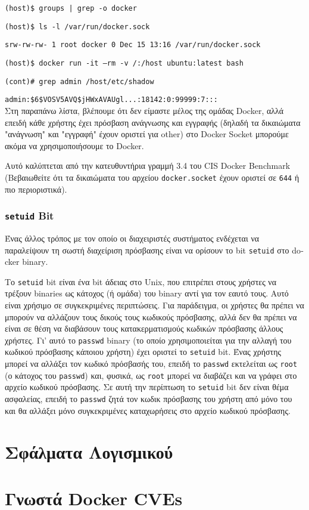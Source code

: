 \texttt{\textlatin{(host)\$ groups | grep -o docker}}

\texttt{\textlatin{(host)\$ ls -l /var/run/docker.sock}}

\texttt{\textlatin{srw-rw-rw- 1 root docker 0 Dec 15 13:16 /var/run/docker.sock}}

\texttt{\textlatin{(host)\$ docker run -it --rm -v /:/host ubuntu:latest bash}}

\texttt{\textlatin{(cont)\# grep admin /host/etc/shadow}}

\texttt{\textlatin{admin:\$6\$VOSV5AVQ\$jHWxAVAUgl...:18142:0:99999:7:::}} \\

Στη παραπάνω λίστα, βλέπουμε ότι δεν είμαστε μέλος της ομάδας
\textlatin{Docker}, αλλά επειδή κάθε χρήστης έχει πρόσβαση ανάγνωσης και
εγγραφής (δηλαδή τα δικαιώματα "ανάγνωση" και "εγγραφή" έχουν οριστεί για
\textlatin{other}) στο \textlatin{Docker Socket} μπορούμε ακόμα να
χρησιμοποιήσουμε το \textlatin{Docker}.

Αυτό καλύπτεται από την κατευθυντήρια γραμμή 3.4 του
\textlatin{CIS Docker Benchmark} (Βεβαιωθείτε ότι τα δικαιώματα του αρχείου
\texttt{\textlatin{docker.socket}} έχουν οριστεί σε \texttt{644} ή πιο
περιοριστικά).

\subsubsection{\texttt{\textlatin{setuid}} \textlatin{Bit}}

Ένας άλλος τρόπος με τον οποίο οι διαχειριστές συστήματος ενδέχεται να
παραλείψουν τη σωστή διαχείριση πρόσβασης είναι να ορίσουν το \textlatin{bit}
\texttt{\textlatin{setuid}} στο \textlatin{docker binary}.

Το \texttt{\textlatin{setuid}} \textlatin{bit} είναι ένα \textlatin{bit} άδειας
στο \textlatin{Unix}, που επιτρέπει στους χρήστες να τρέξουν
\textlatin{binaries} ως κάτοχος (ή ομάδα) του \textlatin{binary} αντί για τον
εαυτό τους. Αυτό είναι χρήσιμο σε συγκεκριμένες περιπτώσεις. Για παράδειγμα,
οι χρήστες θα πρέπει να μπορούν να αλλάζουν τους δικούς τους κωδικούς πρόσβασης,
αλλά δεν θα πρέπει να είναι σε θέση να διαβάσουν τους κατακερματισμούς κωδικών
πρόσβασης άλλους χρήστες. Γι' αυτό το \texttt{\textlatin{passwd}}
\textlatin{binary} (το οποίο χρησιμοποιείται για την αλλαγή του κωδικού
πρόσβασης κάποιου χρήστη) έχει οριστεί το \texttt{\textlatin{setuid}}
\textlatin{bit}. Ένας χρήστης μπορεί να αλλάξει τον κωδικό πρόσβασής του,
επειδή το \texttt{\textlatin{passwd}} εκτελείται ως \texttt{\textlatin{root}}
(ο κάτοχος του \texttt{\textlatin{passwd}}) και, φυσικά, ως
\texttt{\textlatin{root}} μπορεί να διαβάζει και να γράφει στο αρχείο κωδικού
πρόσβασης. Σε αυτή την περίπτωση το \texttt{\textlatin{setuid}} \textlatin{bit}
δεν είναι θέμα ασφαλείας, επειδή το \texttt{\textlatin{passwd}} ζητά τον κωδικ
πρόσβασης του χρήστη από μόνο του και θα αλλάξει μόνο συγκεκριμένες καταχωρήσεις
στο αρχείο κωδικού πρόσβασης.

\section{Σφάλματα Λογισμικού}
\section{Γνωστά \textlatin{Docker CVEs}}

